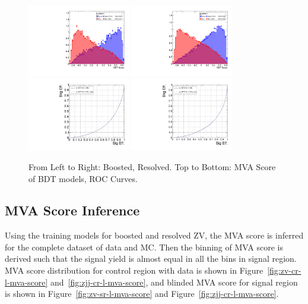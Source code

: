 \begin{figure}[!ht]
  \centering
  \includegraphics[width=0.4\textwidth]{analysis_plots/tmva_plots/zv_BDTG14.pdf}
  \includegraphics[width=0.4\textwidth]{analysis_plots/tmva_plots/zjj_BDTG14.pdf} \\
  \includegraphics[width=0.4\textwidth]{analysis_plots/tmva_plots/zv_BDTG14_roc.pdf}
  \includegraphics[width=0.4\textwidth]{analysis_plots/tmva_plots/zjj_BDTG14_roc.pdf}
  \caption[MVA Score ROC Curve]%
  {From Left to Right: Boosted, Resolved. Top to Bottom: MVA Score of BDT models,
    ROC Curves.}%
  \label{fig:vbs-training-score}
\end{figure}

\clearpage
\subsection{
  MVA Score Inference
}

Using the training models for boosted and resolved ZV, the \gls{MVA} score
is inferred for the complete dataset of data and \gls{MC}.
Then the binning of \gls{MVA} score is derived such that
the signal yield is almost equal in all the bins in signal region.
\gls{MVA} score distribution for control region with
data is shown in Figure~\ref{fig:zv-cr-l-mva-score} and~\ref{fig:zjj-cr-l-mva-score},
and blinded \gls{MVA} score for signal region
is shown in Figure~\ref{fig:zv-sr-l-mva-score}
and Figure~\ref{fig:zjj-cr-l-mva-score}.

